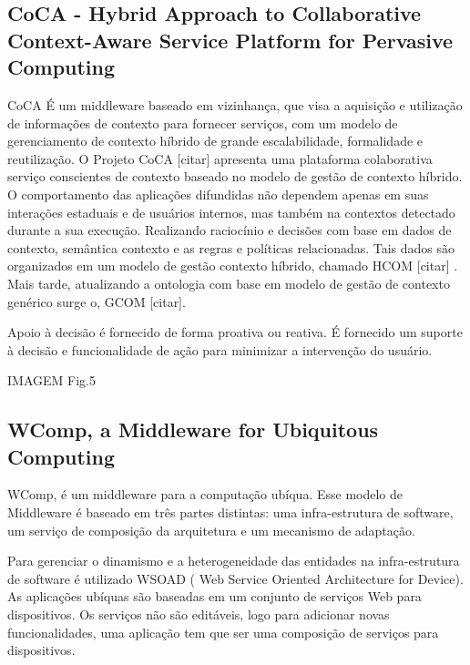 \documentclass[12pt,a4paper,compsoc]{IEEEtran}
\begin{document}
\subsection{CoCA - Hybrid Approach to Collaborative Context-Aware Service Platform for Pervasive Computing}

CoCA É um middleware baseado em vizinhança, que visa a aquisição e utilização de informações de contexto para fornecer serviços, com um modelo de gerenciamento de contexto híbrido de grande escalabilidade, formalidade e reutilização.
O Projeto CoCA [citar] apresenta uma plataforma colaborativa serviço conscientes de contexto baseado no modelo de gestão de contexto híbrido. 
O comportamento das aplicações difundidas não dependem apenas em suas interações estaduais e de usuários internos, mas também na contextos detectado durante a sua execução. Realizando raciocínio e decisões com base em dados de contexto, semântica contexto e as regras e políticas relacionadas. Tais dados são organizados em um modelo de gestão contexto híbrido, chamado HCOM [citar] . Mais tarde, atualizando a ontologia com base em modelo de gestão de contexto genérico surge o, GCOM [citar].

Apoio à decisão é fornecido de forma proativa ou reativa. É fornecido um suporte à decisão e funcionalidade de ação para minimizar a intervenção do usuário.

IMAGEM Fig.5


\subsection{WComp, a Middleware for Ubiquitous Computing}

WComp, é um middleware para a computação ubíqua. Esse modelo de Middleware é baseado em três partes distintas: uma infra-estrutura de software,  um serviço de composição da arquitetura e um mecanismo de adaptação.

Para gerenciar o dinamismo e a heterogeneidade das entidades na infra-estrutura de software é utilizado WSOAD ( Web Service Oriented Architecture for Device). As aplicações ubíquas são baseadas em um conjunto de serviços Web para dispositivos. Os serviços não são editáveis, logo para adicionar novas funcionalidades, uma aplicação tem que ser uma composição de serviços para dispositivos.
\end{document}
